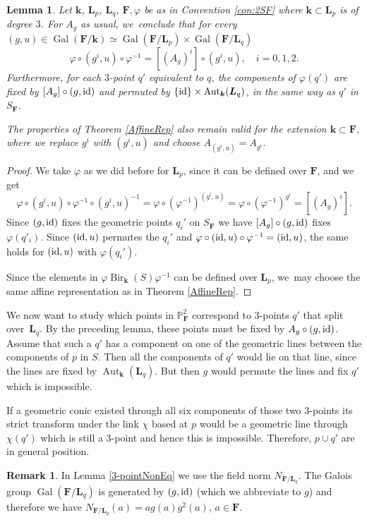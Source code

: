 \documentclass[JEP,XML,SOM,Unicode,NoFloatCountersInSection, NoEqCountersInSection,published]{cedram}
\newcommand{\id}{\textup{id}}
\DeclareMathOperator{\Gal}{Gal}
\newtheorem{lemma}[theorem]{Lemma}
\theoremstyle{definition}
\newtheorem{remark}[theorem]{Remark}
\newcommand{\kk}{{\boldsymbol{k}}}
\newcommand{\FF}{{\boldsymbol{F}}}
\newcommand{\LL}{{\boldsymbol{L}}}
\DeclareMathOperator{\Bir}{Bir}
\DeclareMathOperator{\Aut}{Aut}
\begin{document}
\begin{lemma}
Let $\kk$, $\LL_p$, $\LL_q$, $\FF, \varphi$ be as in Convention \ref{con:2SF} where $\kk \subset \LL_p$ is of degree $3$. For $A_g$ as usual, we~conclude that for every $(g,u) \in \Gal(\FF/\kk) \simeq \Gal(\FF/\LL_p) \times \Gal(\FF/\LL_q)$
\[
\varphi \circ (g^i,u) \circ \varphi^{-1} = [(A_g)^i] \circ (g^i,u), \quad i = 0,1,2.
\]
Furthermore, for each $3$\nobreakdash-point $q'$ equivalent to $q$, the components of $\varphi(q')$ are fixed by $[A_g] \circ (g,\id)$ and permuted by $\{ \id \} \times \Aut_{\kk}(\LL_q)$, in the same way as $q'$ in $S_{\FF}$.

The properties of Theorem \ref{AffineRep} also remain valid for the extension $\kk \subset \FF$, where we replace $g^{i}$ with $(g^{i},u)$ and choose $A_{(g^i,u)} = A_{g^i}$.
\end{lemma}

\begin{proof}
We take $\varphi$ as we did before for $\LL_p$, since it can be defined over $\FF$, and we get
\[
\varphi \circ (g^i,u) \circ \varphi^{-1} \circ (g^i,u)^{-1} = \varphi \circ (\varphi^{-1})^{(g^i,u)} = \varphi \circ (\varphi^{-1})^{g^i} = [(A_g)^i].
\]
Since $(g,\id)$ fixes the geometric points $q_i'$ on $S_{\FF}$ we have $[A_g] \circ (g,\id)$ fixes $\varphi(q'_i)$. Since $(\id,u)$ permutes the $q_i'$ and $\varphi \circ (\id,u) \circ \varphi^{-1} = (\id,u)$, the same holds for $(\id,u)$ with $\varphi(q_i')$.

Since the elements in $\varphi \Bir_{\kk}(S) \varphi^{-1}$ can be defined over $\LL_p$, we~may choose the same affine representation as in Theorem \ref{AffineRep}.
\end{proof}

We now want to study which points in $\mathbb{P}^2_{\FF}$ correspond to $3$\nobreakdash-points $q'$ that split over~$\LL_q$. By the preceding lemma, these points must be fixed by $A_g \circ (g,\id)$. Assume that such a $q'$ has a component on one of the geometric lines between the components of $p$ in $S$. Then all the components of $q'$ would lie on that line, since the lines are fixed by $\Aut_{\kk}(\LL_q)$. But then $g$ would permute the lines and fix $q'$ which is impossible.

If a geometric conic existed through all six components of those two $3$\nobreakdash-points its strict transform under the link $\chi$ based at $p$ would be a geometric line through $\chi(q')$ which is still a $3$\nobreakdash-point and hence this is impossible. Therefore, $p \cup q'$ are in general position.
\begin{remark}
In Lemma \ref{3-pointNonEq} we use the field norm $N_{\FF/\LL_q}$. The Galois group $\Gal(\FF/\LL_q)$ is generated by $(g,\id)$ (which we abbreviate to $g$) and therefore we have $N_{\FF/\LL_q}(a) = a g(a)g^2(a)$, $a \in \FF$.
\end{remark}
\end{document}
